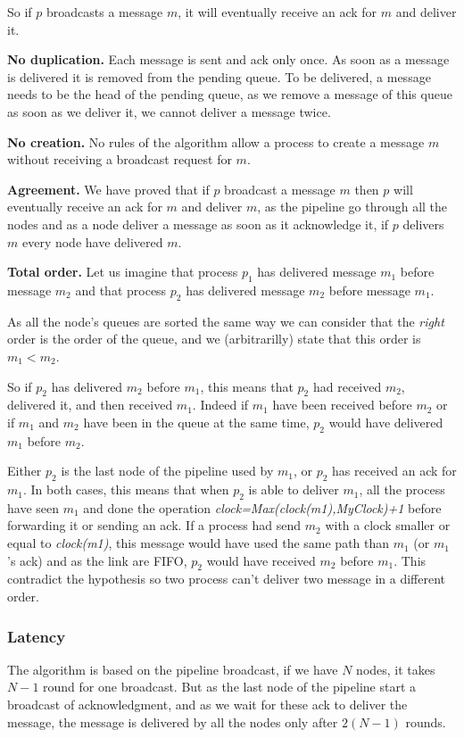 \documentclass[a4paper]{article}
\begin{document}
So if $p$ broadcasts a message $m$, it will eventually receive an ack for $m$
and deliver it.

\bigskip
\noindent\textbf{No duplication.} Each message is sent and ack only once. As
soon as a message is delivered it is removed from the pending queue. To be
delivered, a message needs to be the head of the pending queue, as we remove a
message of this queue as soon as we deliver it, we cannot deliver a message
twice.

\bigskip
\noindent\textbf{No creation.} No rules of the algorithm allow a process to
create a message $m$ without receiving a broadcast request for $m$.

\bigskip
\noindent\textbf{Agreement.} We have proved that if $p$ broadcast a message
$m$ then $p$ will eventually receive an ack for $m$ and deliver $m$, as the
pipeline go through all the nodes and as a node deliver a message as soon as
it acknowledge it, if $p$ delivers $m$ every node have delivered $m$.

\bigskip
\noindent\textbf{Total order.} Let us imagine that process $p_1$ has delivered
message $m_1$ before message $m_2$ and that process $p_2$ has delivered
message $m_2$ before message $m_1$.

As all the node's queues are sorted the same way we can consider that the
\textit{right} order is the order of the queue, and we (arbitrarilly) state
that this order is $m_1 < m_2$.

So if $p_2$ has delivered $m_2$ before $m_1$, this means that $p_2$ had
received $m_2$, delivered it, and then received $m_1$. Indeed if $m_1$ have
been received before $m_2$ or if $m_1$ and $m_2$ have been in the queue at the
same time, $p_2$ would have delivered $m_1$ before $m_2$.

Either $p_2$ is the last node of the pipeline used by $m_1$, or $p_2$ has
received an ack for $m_1$. In both cases, this means that when $p_2$ is able
to deliver $m_1$, all the process have seen $m_1$ and done the operation 
\textit{clock=Max(clock(m1),MyClock)+1} before forwarding it or sending an
ack. If a process had send $m_2$ with a clock smaller or equal to
\textit{clock(m1)}, this message would have used the same path than $m_1$
(or $m_1$'s ack) and as the link are FIFO, $p_2$ would have received $m_2$
before $m_1$. This contradict the hypothesis so two process can't deliver two
message in a different order.

\subsubsection{Latency}
The algorithm is based on the pipeline broadcast, if we have $N$ nodes, it takes
$N-1$ round for one broadcast. But as the last node of the pipeline start a
broadcast of acknowledgment, and as we wait for these ack to deliver the
message, the message is delivered by all the nodes only after $2(N-1)$ rounds.
\end{document}

